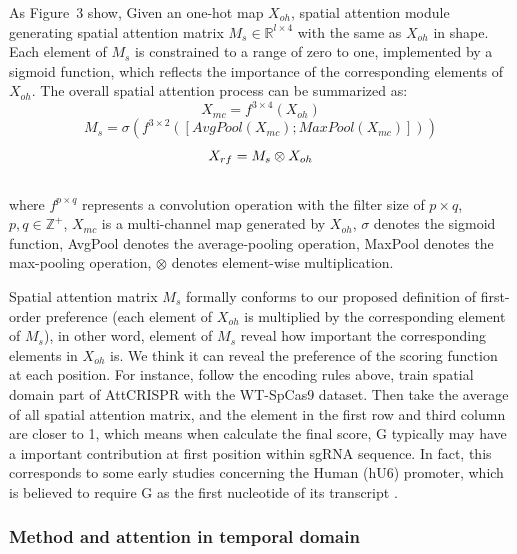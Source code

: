 \documentclass{bioinfo}
\begin{document}
As Figure~3\vphantom{\ref{fig:03}} show, Given an one-hot map $X_{oh}$, spatial attention module generating spatial attention matrix 
$M_s\in\mathbb{R}^{l\times 4}$ with the same as $X_{oh}$ in shape. 
Each element of $M_s$ is constrained to a range of zero to one, implemented by a sigmoid function, which reflects the importance of the corresponding elements of $X_{oh}$.
The overall spatial attention process can be summarized as:
\begin{equation}
X_{mc} = f^{3\times4}(X_{oh})\label{eq:09}
\end{equation}
\begin{equation}
M_s = \sigma(f^{3\times2}([AvgPool(X_{mc});MaxPool(X_{mc})]))\label{eq:10}
\end{equation}
\begin{equation}
X_{rf} = M_s\otimes X_{oh}\label{eq:11}\vspace*{-10pt}
\end{equation}\\

where $f^{p\times q}$ represents a convolution operation with the filter size of $p\times q$, 
$p,q\in\mathbb{Z}^{+}$, $X_{mc}$ is a multi-channel map generated by $X_{oh}$, $\sigma$ denotes the sigmoid function, 
AvgPool denotes the average-pooling operation, MaxPool denotes the max-pooling operation, $\otimes$ denotes element-wise multiplication.

Spatial attention matrix $M_s$ formally conforms to our proposed definition of first-order preference (each element of $X_{oh}$ is multiplied by the corresponding element of $M_s$), 
in other word, element of $M_s$ reveal how important the corresponding elements in $X_{oh}$ is. 
We think it can reveal the preference of the scoring function at each position. 
For instance, follow the encoding rules above, train spatial domain part of AttCRISPR with the WT-SpCas9 dataset. 
Then take the average of all spatial attention matrix, and the element in the first row and third column are closer to 1, which means when calculate the final score, 
G typically may have a important contribution at first position within sgRNA sequence. 
In fact, this corresponds to some early studies concerning the Human (hU6) promoter, which is believed to require G as the first nucleotide of its transcript \citep{cong2013multiplex,jinek2012a,mali2013rnaguided}.

\subsubsection{Method and attention in temporal domain}
\end{document}
